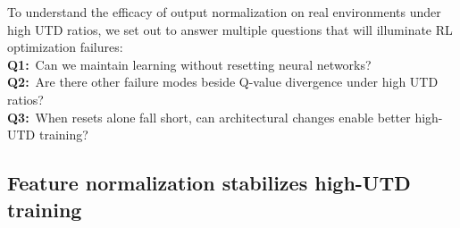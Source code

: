 To understand the efficacy of output normalization on real environments under high UTD ratios, we set out to answer multiple questions that will illuminate RL optimization failures:\\
{\bf Q1:}~Can we maintain learning without resetting neural networks?\\
{\bf Q2:}~Are there other failure modes beside Q-value divergence under high UTD ratios?\\
{\bf Q3:}~When resets alone fall short, can architectural changes enable better high-UTD training?

\subsection{Feature normalization stabilizes high-UTD training} 

